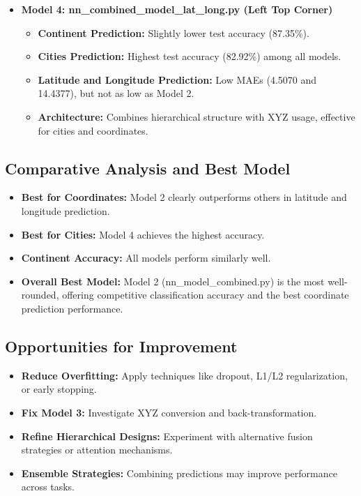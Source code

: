 \documentclass{article}
\begin{document}
\begin{itemize}
    \item \textbf{Model 4: nn\_combined\_model\_lat\_long.py (Left Top Corner)}
    \begin{itemize}
        \item \textbf{Continent Prediction:} Slightly lower test accuracy (87.35\%).
        \item \textbf{Cities Prediction:} Highest test accuracy (82.92\%) among all models.
        \item \textbf{Latitude and Longitude Prediction:} Low MAEs (4.5070 and 14.4377), but not as low as Model 2.
        \item \textbf{Architecture:} Combines hierarchical structure with XYZ usage, effective for cities and coordinates.
    \end{itemize}
\end{itemize}

\subsection*{Comparative Analysis and Best Model}
\begin{itemize}
    \item \textbf{Best for Coordinates:} Model 2 clearly outperforms others in latitude and longitude prediction.
    \item \textbf{Best for Cities:} Model 4 achieves the highest accuracy.
    \item \textbf{Continent Accuracy:} All models perform similarly well.
    \item \textbf{Overall Best Model:} Model 2 (nn\_model\_combined.py) is the most well-rounded, offering competitive classification accuracy and the best coordinate prediction performance.
\end{itemize}

\subsection*{Opportunities for Improvement}
\begin{itemize}
    \item \textbf{Reduce Overfitting:} Apply techniques like dropout, L1/L2 regularization, or early stopping.
    \item \textbf{Fix Model 3:} Investigate XYZ conversion and back-transformation.
    \item \textbf{Refine Hierarchical Designs:} Experiment with alternative fusion strategies or attention mechanisms.
    \item \textbf{Ensemble Strategies:} Combining predictions may improve performance across tasks.
\end{itemize}


\end{document}
